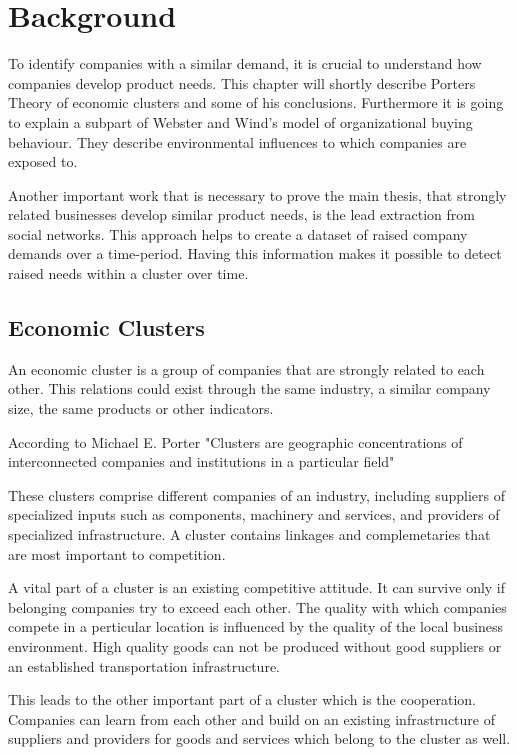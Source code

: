 \section{Background}

To identify companies with a similar demand, it is crucial to understand how companies develop product needs. This chapter will shortly describe Porters Theory \cite{CompanyClusters} of
economic clusters and some of his conclusions. Furthermore it is going to explain a subpart of
Webster and Wind's model \cite{BusinessBuyingBehavior} of organizational buying behaviour. They describe environmental influences to which
companies are exposed to.

Another important work that is necessary to prove the main thesis, that strongly related businesses develop similar product needs,
is the lead extraction from social networks.
This approach helps to create a dataset of raised company demands over a time-period. Having this information makes
it possible to detect raised needs within a cluster over time.


\subsection{Economic Clusters}
An economic cluster is a group of companies that are strongly related to each other. This relations could exist
through the same industry, a similar company size, the same products or other indicators.

According to Michael E. Porter \cite{CompanyClusters} "Clusters are geographic concentrations of
interconnected companies and institutions in a particular field"

These clusters comprise different companies of an industry, including suppliers of specialized inputs such as components,
machinery and services, and providers of specialized infrastructure. A cluster contains linkages and complemetaries
that are most important to competition.

A vital part of a cluster is an existing competitive attitude. It can survive only if belonging companies try to
exceed each other. The quality with which companies compete in a perticular location is influenced by the quality
of the local business environment. High quality goods can not be produced without good suppliers or an established
transportation infrastructure.

This leads to the other important part of a cluster which is the cooperation. Companies can learn from each other
and build on an existing infrastructure  of suppliers and providers for goods and services which belong to the
cluster as well.

